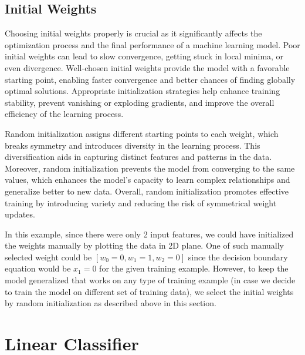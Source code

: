 \documentclass[12pt, a4paper, twoside]{article}
\begin{document}
\subsection{Initial Weights}\label{SS:lr-w0}
Choosing initial weights properly is crucial as it significantly affects the optimization process and the final performance of a machine learning model. Poor initial weights can lead to slow convergence, getting stuck in local minima, or even divergence. Well-chosen initial weights provide the model with a favorable starting point, enabling faster convergence and better chances of finding globally optimal solutions. Appropriate initialization strategies help enhance training stability, prevent vanishing or exploding gradients, and improve the overall efficiency of the learning process.
\par
Random initialization assigns different starting points to each weight, which breaks symmetry and introduces diversity in the learning process. This diversification aids in capturing distinct features and patterns in the data. Moreover, random initialization prevents the model from converging to the same values, which enhances the model's capacity to learn complex relationships and generalize better to new data. Overall, random initialization promotes effective training by introducing variety and reducing the risk of symmetrical weight updates. 
\par
In this example, since there were only 2 input features, we could have initialized the weights manually by plotting the data in 2D plane. One of such manually selected weight could be $[w_0 = 0, w_1 = 1, w_2 = 0]$ since the decision boundary equation would be $x_1 = 0$ for the given training example. However, to keep the model generalized that works on any type of training example (in case we decide to train the model on different set of training data), we select the initial weights by random initialization as described above in this section.
\section{Linear Classifier}\label{S:LC}
\end{document}

